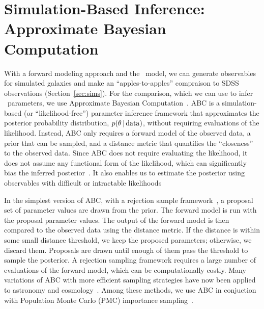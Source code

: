 \section{Simulation-Based Inference: Approximate Bayesian Computation} \label{sec:abc}
With a forward modeling approach and the \eda~model, we can generate
observables for simulated galaxies and make an ``apples-to-apples'' compraison
to SDSS observations (Section~\ref{sec:sims}). For the comparison, which we can
use to infer \eda~parameters, we use Approximate Bayesian
Computation~\citep[hereafter ABC;][]{diggle1984, tavare1997, pritchard1999,
beaumont2009, delmoral2012}.  ABC is a simulation-based (or
``likelihood-free'') parameter inference framework that approximates the
posterior probability distribution, $p(\theta\,|\,{\rm data})$, without
requiring evaluations of the likelihood.  Instead, ABC only requires a forward
model of the observed data, a prior that can be sampled, and a distance metric
that quantifies the ``closeness'' to the observed data. Since ABC does not
require evaluating the likelihood, it does not assume any functional form of
the likelihood, which can significantly bias the inferred
posterior~\citep{hahn2019}. It also enables us to estimate the posterior using
observables with difficult or intractable likelihoods~\citep{hahn2017a}

In the simplest version of ABC, with a rejection sample
framework~\citep{pritchard1999}, a proposal set of parameter values are drawn
from the prior. The forward model is run with the proposal parameter values.
The output of the forward model is then compared to the observed data
using the distance metric. If the distance is within some small distance
threshold, we keep the proposed parameters; otherwise, we discard them. 
Proposals are drawn until enough of them pass the threshold to sample the posterior. A rejection sampling
framework requires a large number of evaluations of the forward model, which
can be computationally costly. Many variations of ABC with more efficient
sampling strategies have now been applied to astronomy and
cosmology~\citep[\eg][]{cameron2012, weyant2013, ishida2015, lin2016, alsing2018}.
Among these methods, we use ABC in conjuction with Population Monte Carlo (PMC) 
importance sampling~\citep{hahn2017a, hahn2017b, hahn2019a}.

